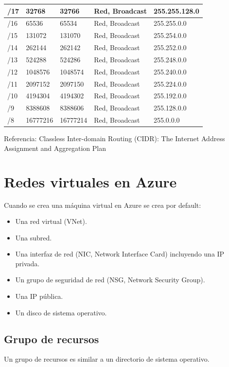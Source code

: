 \begin{center}
\begin{tabularx}{\linewidth}{|X|X|X|X|X|}
/17 & 32768 & 32766 & Red, Broadcast & 255.255.128.0 \\ \hline
/16 & 65536 & 65534 & Red, Broadcast & 255.255.0.0 \\ \hline
/15 & 131072 & 131070 & Red, Broadcast & 255.254.0.0 \\ \hline
/14 & 262144 & 262142 & Red, Broadcast & 255.252.0.0 \\ \hline
/13 & 524288 & 524286 & Red, Broadcast & 255.248.0.0 \\ \hline
/12 & 1048576 & 1048574 & Red, Broadcast & 255.240.0.0 \\ \hline
/11 & 2097152 & 2097150 & Red, Broadcast & 255.224.0.0 \\ \hline
/10 & 4194304 & 4194302 & Red, Broadcast & 255.192.0.0 \\ \hline
/9 & 8388608 & 8388606 & Red, Broadcast & 255.128.0.0 \\ \hline
/8 & 16777216 & 16777214 & Red, Broadcast & 255.0.0.0 \\ \hline
\end{tabularx}
\end{center}

Referencia: Classless Inter-domain Routing (CIDR): The Internet Address Assignment and Aggregation Plan

\chapter{Redes virtuales en Azure}

Cuando se crea una máquina virtual en Azure se crea por default:

\begin{itemize}
\item Una red virtual (VNet).
\item Una subred.
\item Una interfaz de red (NIC, Network Interface Card) incluyendo una IP privada.
\item Un grupo de seguridad de red (NSG, Network Security Group).
\item Una IP pública.
\item Un disco de sistema operativo.
\end{itemize}

\section{Grupo de recursos}

Un grupo de recursos es similar a un directorio de sistema operativo.

